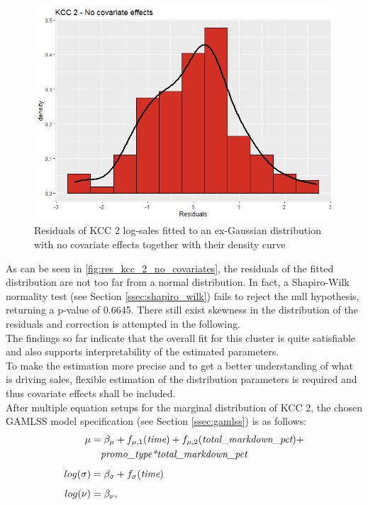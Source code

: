 \begin{figure}[H]
\centering
  \includegraphics[width=0.45\linewidth]{figures/res_kcc_2_no_covariates.png}
  \caption{Residuals of KCC 2 log-sales fitted to an ex-Gaussian distribution with no covariate effects together with their density curve}
  \label{fig:res_kcc_2_no_covariates}
\end{figure}

As can be seen in \autoref{fig:res_kcc_2_no_covariates}, the residuals of the fitted distribution are not too far from a normal distribution. 
In fact, a Shapiro-Wilk normality test (see Section \ref{ssec:shapiro_wilk}) fails to reject the null hypothesis, returning a p-value of 0.6645.
There still exist skewness in the distribution of the residuals and correction is attempted in the following. 
\\

The findings so far indicate that the overall fit for this cluster is quite satisfiable and also supports interpretability of the estimated parameters. \\
To make the estimation more precise and to get a better understanding of what is driving sales, flexible estimation of the distribution parameters is required and thus covariate effects shall be included. \\

After multiple equation setups for the marginal distribution of \ac{KCC} 2, the chosen \ac{GAMLSS} model specification (see Section \ref{ssec:gamlss}) is as follows:
\begin{equation}
\begin{aligned}
\mu &= \beta_{\mu} + f_{\mu , 1}(\textit{time}) + f_{\mu ,2}(\textit{total\_markdown\_pct}) + \\
 & \quad \textit{promo\_type*total\_markdown\_pct} \\ \noalign{\vskip5pt}
log(\sigma) &= \beta_{\sigma} + f_{\sigma}(\textit{time}) \\ \noalign{\vskip5pt}
log(\nu) &=  \beta_{\nu}, 
\end{aligned}
\label{eq:gamlss_kcc_2}
\end{equation} 

